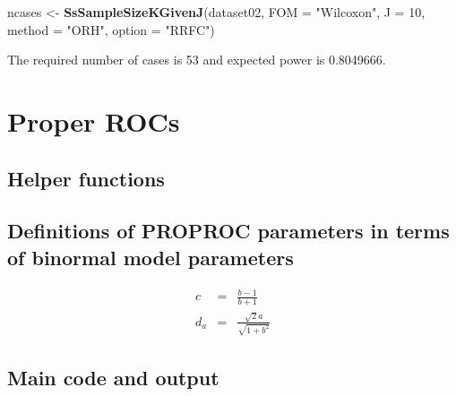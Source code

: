 \documentclass[
]{book}
\newenvironment{Shaded}{\begin{snugshade}}{\end{snugshade}}
\newcommand{\DataTypeTok}[1]{\textcolor[rgb]{0.13,0.29,0.53}{#1}}
\newcommand{\DecValTok}[1]{\textcolor[rgb]{0.00,0.00,0.81}{#1}}
\newcommand{\KeywordTok}[1]{\textcolor[rgb]{0.13,0.29,0.53}{\textbf{#1}}}
\newcommand{\NormalTok}[1]{#1}
\newcommand{\StringTok}[1]{\textcolor[rgb]{0.31,0.60,0.02}{#1}}
\begin{document}
\begin{Shaded}
\begin{Highlighting}[]
\NormalTok{ncases \textless{}{-}}\StringTok{ }\KeywordTok{SsSampleSizeKGivenJ}\NormalTok{(dataset02, }\DataTypeTok{FOM =} \StringTok{"Wilcoxon"}\NormalTok{, }\DataTypeTok{J =} \DecValTok{10}\NormalTok{, }\DataTypeTok{method =} \StringTok{"ORH"}\NormalTok{, }\DataTypeTok{option =} \StringTok{"RRFC"}\NormalTok{)}
\end{Highlighting}
\end{Shaded}

The required number of cases is 53 and expected power is 0.8049666.

\hypertarget{ProperROCs}{%
\chapter{Proper ROCs}\label{ProperROCs}}

\hypertarget{helper-functions}{%
\section{Helper functions}\label{helper-functions}}

\hypertarget{definitions-of-proproc-parameters-in-terms-of-binormal-model-parameters}{%
\section{Definitions of PROPROC parameters in terms of binormal model parameters}\label{definitions-of-proproc-parameters-in-terms-of-binormal-model-parameters}}

\begin{eqnarray*}
c & = & \frac{b-1}{b+1}\\
d_a & = & \frac{\sqrt{2}a}{\sqrt{1+{b^{2}}}} 
\end{eqnarray*}

\hypertarget{main-code-and-output}{%
\section{Main code and output}\label{main-code-and-output}}
\end{document}
